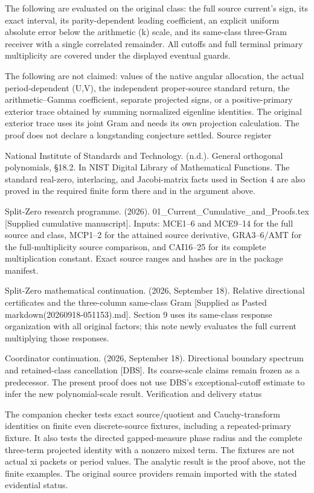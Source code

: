 The following are evaluated on the original class: the full source current's sign, its exact interval, its parity-dependent leading coefficient, an explicit uniform absolute error below the arithmetic (k) scale, and its same-class three-Gram receiver with a single correlated remainder. All cutoffs and full terminal primary multiplicity are covered under the displayed eventual guards.

The following are not claimed: values of the native angular allocation, the actual period-dependent (U,V), the independent proper-source standard return, the arithmetic--Gamma coefficient, separate projected signs, or a positive-primary exterior trace obtained by summing normalized eigenline identities. The original exterior trace uses its joint Gram and needs its own projection calculation. The proof does not declare a longstanding conjecture settled. Source register

National Institute of Standards and Technology. (n.d.). General orthogonal polynomials, §18.2. In NIST Digital Library of Mathematical Functions. The standard real-zero, interlacing, and Jacobi-matrix facts used in Section 4 are also proved in the required finite form there and in the argument above.

Split-Zero research programme. (2026). 01\_Current\_Cumulative\_and\_Proofs.tex {[}Supplied cumulative manuscript{]}. Inputs: MCE1--6 and MCE9--14 for the full source and class, MCP1--2 for the attained source derivative, GRA3--6/AMT for the full-multiplicity source comparison, and CAI16--25 for its complete multiplication constant. Exact source ranges and hashes are in the package manifest.

Split-Zero mathematical continuation. (2026, September 18). Relative directional certificates and the three-column same-class Gram {[}Supplied as Pasted markdown(20260918-051153).md{]}. Section 9 uses its same-class response organization with all original factors; this note newly evaluates the full current multiplying those responses.

Coordinator continuation. (2026, September 18). Directional boundary spectrum and retained-class cancellation {[}DBS{]}. Its coarse-scale claims remain frozen as a predecessor. The present proof does not use DBS's exceptional-cutoff estimate to infer the new polynomial-scale result. Verification and delivery status

The companion checker tests exact source/quotient and Cauchy-transform identities on finite even discrete-source fixtures, including a repeated-primary fixture. It also tests the directed gapped-measure phase radius and the complete three-term projected identity with a nonzero mixed term. The fixtures are not actual xi packets or period values. The analytic result is the proof above, not the finite examples. The original source providers remain imported with the stated evidential status.

